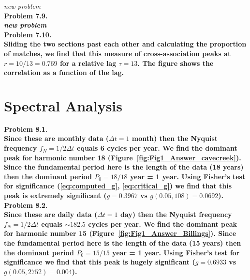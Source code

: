 {\it new problem}\\

\noindent
\bf{Problem 7.9.} \\

{\it new problem}\\

\noindent
\bf{Problem 7.10.} \\

Sliding the two sections past each other and calculating the proportion of matches, we find that
this measure of cross-association peaks at $r = 10/13 = 0.769$ for a relative lag $\tau = 13$.
The figure shows the correlation as a function of the lag.

\section{Spectral Analysis}

\noindent
\bf{Problem 8.1.} \\

Since these are monthly data ($\Delta t = 1$ month) then the Nyquist frequency $f_N = 1/2\Delta t$ equals
6 cycles per year.  We find the dominant peak for harmonic number 18 (Figure~\ref{fig:Fig1_Answer_cavecreek}).
Since the fundamental period here
is the length of the data (18 years) then the dominant period $P_0 = 18/18$ year = 1 year. Using Fisher's
test for significance (\ref{eq:computed_g}, \ref{eq:critical_g}) we find that this peak
is extremely significant ($g = 0.3967$ vs $g(0.05,108) = 0.0692$). \\


\noindent
\bf{Problem 8.2.} \\

Since these are daily data ($\Delta t = 1$ day) then the Nyquist frequency $f_N = 1/2\Delta t$ equals
$\sim 182.5$ cycles per year.  We find the dominant peak for harmonic number 15 (Figure~\ref{fig:Fig1_Answer_Billings}).
Since the fundamental period here
is the length of the data (15 years) then the dominant period $P_0 = 15/15$ year = 1 year. Using Fisher's
test for significance we find that this peak is hugely significant ($g = 0.6933$ vs $g(0.05,2752) = 0.004$). \\


